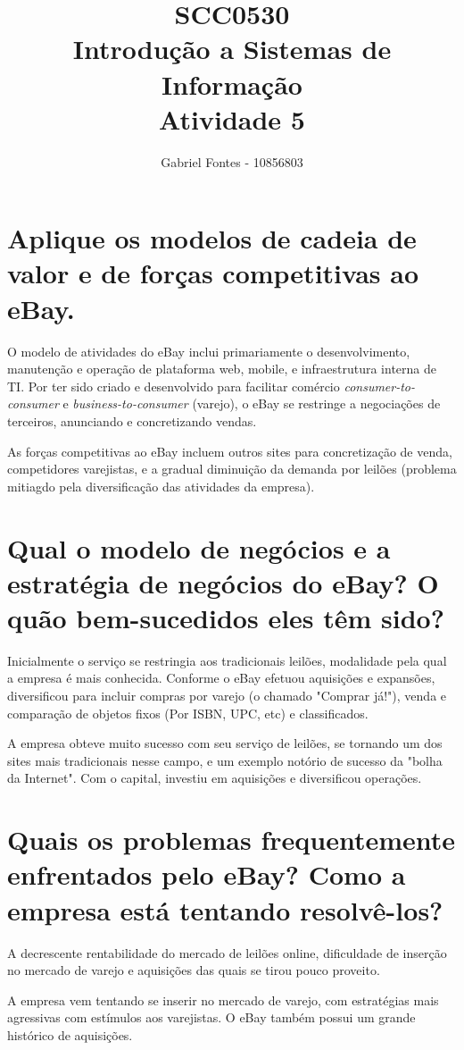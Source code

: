 \documentclass[12pt]{article}
\title{SCC0530 \\Introdução a Sistemas de Informação \\ Atividade 5}
\author{Gabriel Fontes - 10856803}
\begin{document}
\maketitle
\section{Aplique os modelos de cadeia de valor e de forças competitivas ao eBay.}
O modelo de atividades do eBay inclui primariamente o desenvolvimento, manutenção e operação de plataforma web, mobile, e infraestrutura interna de TI\cite{ebay_info}. Por ter sido criado e desenvolvido para facilitar comércio \textit{consumer-to-consumer} e \textit{business-to-consumer} (varejo), o eBay se restringe a negociações de terceiros, anunciando e concretizando vendas.

As forças competitivas ao eBay incluem outros sites para concretização de venda, competidores varejistas, e a gradual diminuição da demanda por leilões (problema mitiagdo pela diversificação das atividades da empresa).

\section{Qual o modelo de negócios e a estratégia de negócios do eBay? O quão bem-sucedidos eles têm sido?}
Inicialmente o serviço se restringia aos tradicionais leilões, modalidade pela qual a empresa é mais conhecida. Conforme o eBay efetuou aquisições e expansões, diversificou para incluir compras por varejo (o chamado "Comprar já!"), venda e comparação de objetos fixos (Por ISBN, UPC, etc) e classificados.

A empresa obteve muito sucesso com seu serviço de leilões, se tornando um dos sites mais tradicionais nesse campo, e um exemplo notório de sucesso da "bolha da Internet"\cite{ebay_bolha}. Com o capital, investiu em aquisições e diversificou operações.

\section{Quais os problemas frequentemente enfrentados pelo eBay? Como a empresa está tentando resolvê-los?}
A decrescente rentabilidade do mercado de leilões online, dificuldade de inserção no mercado de varejo e aquisições das quais se tirou pouco proveito.

A empresa vem tentando se inserir no mercado de varejo, com estratégias mais agressivas com estímulos aos varejistas. O eBay também possui um grande histórico de aquisições.
\end{document}
